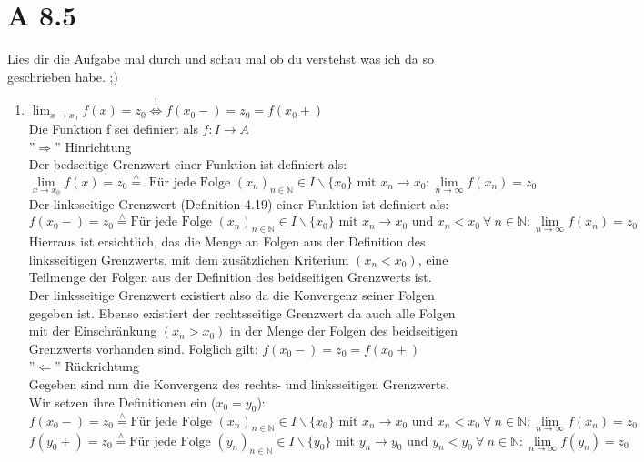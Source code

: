 \documentclass{article}
\newcommand{\proofeqv}{\overset{!}{\Leftrightarrow}}
\newcommand{\equivalent}{\overset{\scriptscriptstyle\wedge}{=}}
\begin{document}
    \section*{A 8.5}
    {\Large Lies dir die Aufgabe mal durch und schau mal ob du verstehst was ich da so geschrieben habe. ;)}
    \begin{enumerate}[ label = (\alph*)]
        \item \( \lim_{x \to x_0} f(x) = z_0 \proofeqv f(x_0-) = z_0 = f(x_0+) \) \\
        Die Funktion f sei definiert als \(f: I \to A\) \\
        ''\(\Rightarrow \)'' Hinrichtung \\
        Der bedseitige Grenzwert einer Funktion ist definiert als:
        \[ \lim_{x \to x_0} f(x) = z_0 \equivalent
        \text{ Für jede Folge } {(x_n)}_{n \in \mathbb{N}} \in I \backslash \{ x_0 \} \text{ mit } x_n \to x_0: \lim_{n \to \infty} f(x_n) = z_0 \]
        Der linksseitige Grenzwert (Definition 4.19) einer Funktion ist definiert als: 
        \[f(x_0-) = z_0 \equivalent \text{Für jede Folge } { (x_n)}_{n \in \mathbb{N}} \in I \backslash \{ x_0 \} \text{ mit }
             x_n \to x_0 \text{ und } x_n < x_0 \ \forall \ n \in \mathbb{N}: \lim_{n \to \infty} f(x_n) = z_0 \]
        Hierraus ist ersichtlich, das die Menge an Folgen aus der Definition des linksseitigen Grenzwerts,
        mit dem zusätzlichen Kriterium \((x_n < x_0)\),
        eine Teilmenge der Folgen aus der Definition des beidseitigen Grenzwerts ist. \\
        Der linksseitige Grenzwert existiert also da die Konvergenz seiner Folgen gegeben ist.
        Ebenso existiert der rechtsseitige Grenzwert da auch alle Folgen
        mit der Einschränkung \((x_n > x_0)\) in der Menge der Folgen des beidseitigen Grenzwerts vorhanden sind.
        Folglich gilt: \( f(x_0-) = z_0 = f(x_0+) \) \\
        \linebreak
        ''\( \Leftarrow \)'' Rückrichtung \\
        Gegeben sind nun die Konvergenz des rechts- und linksseitigen Grenzwerts. Wir setzen ihre Definitionen ein (\(x_0 = y_0\)):
        \[f(x_0-) = z_0 \equivalent \text{Für jede Folge } { (x_n)}_{n \in \mathbb{N}} \in I \backslash \{ x_0 \} \text{ mit }
             x_n \to x_0 \text{ und } x_n < x_0 \ \forall \ n \in \mathbb{N}: \lim_{n \to \infty} f(x_n) = z_0 \]
        \[f(y_0+) = z_0 \equivalent \text{Für jede Folge } { (y_n)}_{n \in \mathbb{N}} \in I \backslash \{ y_0 \} \text{ mit }
             y_n \to y_0 \text{ und } y_n < y_0 \ \forall \ n \in \mathbb{N}: \lim_{n \to \infty} f(y_n) = z_0 \]
        

\end{enumerate}
\end{document}
